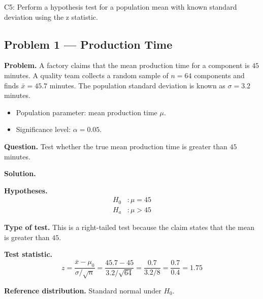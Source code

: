 



\begin{ExamCriteria}
    \item C5: Perform a hypothesis test for a population mean with known standard deviation using the z statistic.
\end{ExamCriteria}

\begin{ExamProblems}

\hypertarget{c5-ex1}{}
\item
\subsection*{Problem 1 — Production Time}

\textbf{Problem.} A factory claims that the mean production time for a component is \(45\) minutes. A quality team collects a random sample of \(n=64\) components and finds \(\bar{x}=45.7\) minutes. The population standard deviation is known as \(\sigma=3.2\) minutes.
\begin{itemize}
    \item Population parameter: mean production time \(\mu\).
    \item Significance level: \(\alpha=0.05\).
\end{itemize}

\textbf{Question.} Test whether the true mean production time is greater than \(45\) minutes.

\textbf{Solution.}

\textbf{Hypotheses.}
\[
\begin{aligned}
H_0&: \mu = 45 \\
H_a&: \mu > 45
\end{aligned}
\]

\textbf{Type of test.} This is a right-tailed test because the claim states that the mean is greater than \(45\).

\textbf{Test statistic.}
\[
z = \frac{\bar{x}-\mu_0}{\sigma/\sqrt{n}} = \frac{45.7-45}{3.2/\sqrt{64}} = \frac{0.7}{3.2/8} = \frac{0.7}{0.4} = 1.75
\]

\textbf{Reference distribution.} Standard normal under \(H_0\).


\end{ExamProblems}
